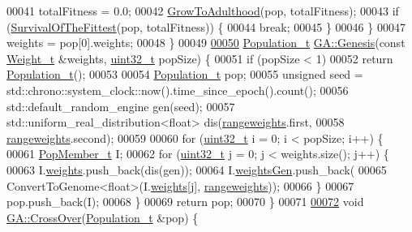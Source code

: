 \begin{DoxyCode}
00041     totalFitness = 0.0;
00042     \hyperlink{class_soil_math_1_1_g_a_a7b84b10bfb6069fe44bbd137e3a9dbb0}{GrowToAdulthood}(pop, totalFitness);
00043     \textcolor{keywordflow}{if} (\hyperlink{class_soil_math_1_1_g_a_ac2c10631815408d044738f678c67e98b}{SurvivalOfTheFittest}(pop, totalFitness)) \{
00044       \textcolor{keywordflow}{break};
00045     \}
00046   \}
00047   weights = pop[0].weights;
00048 \}
00049 
\hypertarget{_g_a_8cpp_source_l00050}{}\hyperlink{class_soil_math_1_1_g_a_a141afd2573d2323f67915e6cea4f1a9f}{00050} \hyperlink{_soil_math_types_8h_a8d2d4c736cf817d048a2d66dec8b12ec}{Population\_t} \hyperlink{class_soil_math_1_1_g_a_a141afd2573d2323f67915e6cea4f1a9f}{GA::Genesis}(\textcolor{keyword}{const} \hyperlink{_soil_math_types_8h_ac56ad2b88186620fd0de0d213aa715dd}{Weight\_t} &weights, 
      \hyperlink{_soil_math_types_8h_a435d1572bf3f880d55459d9805097f62}{uint32\_t} popSize) \{
00051   \textcolor{keywordflow}{if} (popSize < 1)
00052     \textcolor{keywordflow}{return} \hyperlink{_soil_math_types_8h_a8d2d4c736cf817d048a2d66dec8b12ec}{Population\_t}();
00053 
00054   \hyperlink{_soil_math_types_8h_a8d2d4c736cf817d048a2d66dec8b12ec}{Population\_t} pop;
00055   \textcolor{keywordtype}{unsigned} seed = std::chrono::system\_clock::now().time\_since\_epoch().count();
00056   std::default\_random\_engine gen(seed);
00057   std::uniform\_real\_distribution<float> dis(\hyperlink{class_soil_math_1_1_g_a_a7613e87f93e42724d03008e3603cf21b}{rangeweights}.first,
00058                                             \hyperlink{class_soil_math_1_1_g_a_a7613e87f93e42724d03008e3603cf21b}{rangeweights}.second);
00059 
00060   \textcolor{keywordflow}{for} (\hyperlink{_soil_math_types_8h_a435d1572bf3f880d55459d9805097f62}{uint32\_t} i = 0; i < popSize; i++) \{
00061     \hyperlink{struct_pop_member_struct}{PopMember\_t} I;
00062     \textcolor{keywordflow}{for} (\hyperlink{_soil_math_types_8h_a435d1572bf3f880d55459d9805097f62}{uint32\_t} j = 0; j < weights.size(); j++) \{
00063       I.\hyperlink{struct_pop_member_struct_aeba960170ef60a906c730cc24cd90367}{weights}.push\_back(dis(gen));
00064       I.\hyperlink{struct_pop_member_struct_a072fadb4863e0cf77b55ad3b46b62522}{weightsGen}.push\_back(
00065           ConvertToGenome<float>(I.\hyperlink{struct_pop_member_struct_aeba960170ef60a906c730cc24cd90367}{weights}[j], \hyperlink{class_soil_math_1_1_g_a_a7613e87f93e42724d03008e3603cf21b}{rangeweights}));
00066     \}
00067     pop.push\_back(I);
00068   \}
00069   \textcolor{keywordflow}{return} pop;
00070 \}
00071 
\hypertarget{_g_a_8cpp_source_l00072}{}\hyperlink{class_soil_math_1_1_g_a_abf408d603b2afb188a6d265eb6309b69}{00072} \textcolor{keywordtype}{void} \hyperlink{class_soil_math_1_1_g_a_abf408d603b2afb188a6d265eb6309b69}{GA::CrossOver}(\hyperlink{_soil_math_types_8h_a8d2d4c736cf817d048a2d66dec8b12ec}{Population\_t} &pop) \{

\end{DoxyCode}
